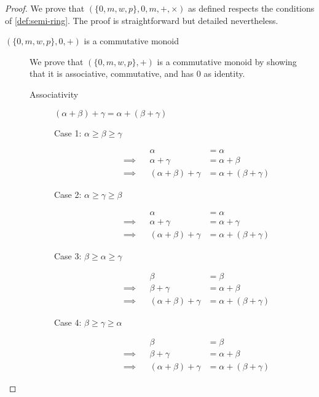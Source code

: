 \documentclass[runningheads]{llncs}
\begin{document}
\begin{proof}
	We prove that \((\{0,m,w,p\}, 0, m, +, \times )\) as defined respects the conditions of \autoref{def:semi-ring}.
	The proof is straightforward but detailed nevertheless.
	\begin{description}
		\item[\((\{0,m,w,p\}, 0, +)\) is a commutative monoid]
			We prove that \((\{0,m,w,p\}, +)\) is a commutative monoid by showing that it is associative, commutative, and has \(0\) as identity.

			\begin{description}
				\item[Associativity]
					\((\alpha + \beta ) + \gamma = \alpha + (\beta + \gamma)\)
					\begin{description}
						\item[Case 1: \(\alpha \geqslant \beta \geqslant \gamma\)]
							\begin{align*}
								         &  & \alpha                     & = \alpha                    \\
								\implies &  & \alpha + \gamma            & = \alpha + \beta            \\
								\implies &  & (\alpha + \beta ) + \gamma & = \alpha + (\beta + \gamma)
							\end{align*}

						\item[Case 2: \(\alpha \geqslant \gamma \geqslant \beta\)]
							\begin{align*}
								         &  & \alpha                     & = \alpha                    \\
								\implies &  & \alpha + \gamma            & = \alpha + \gamma           \\
								\implies &  & (\alpha + \beta ) + \gamma & = \alpha + (\beta + \gamma)
							\end{align*}

						\item[Case 3: \(\beta \geqslant \alpha \geqslant \gamma\)]
							\begin{align*}
								         &  & \beta                      & = \beta                     \\
								\implies &  & \beta + \gamma             & = \alpha + \beta            \\
								\implies &  & (\alpha + \beta ) + \gamma & = \alpha + (\beta + \gamma)
							\end{align*}

						\item[Case 4: \(\beta \geqslant \gamma \geqslant \alpha\)]
							\begin{align*}
								         &  & \beta                      & = \beta                     \\
								\implies &  & \beta + \gamma             & = \alpha + \beta            \\
								\implies &  & (\alpha + \beta ) + \gamma & = \alpha + (\beta + \gamma)
							\end{align*}


\end{description}
\end{description}
\end{description}
\end{proof}
\end{document}
